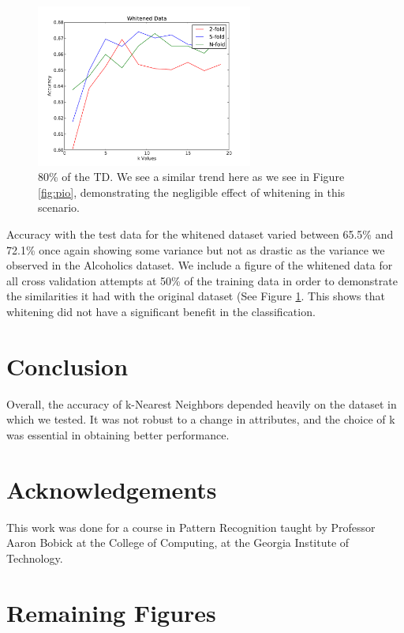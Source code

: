 \documentclass[conference]{acmsiggraph}
\begin{document}
\begin{figure}[ht]
  \centering
  \includegraphics[width=2.8in]{images/pi_w_50.pdf}
  \caption{80\% of the TD. We see a similar trend here as we see in Figure \ref{fig:pio}, demonstrating the negligible effect of whitening in this scenario. }
  \label{fig:piw}
\end{figure}

Accuracy with the test data for the whitened dataset varied between 65.5\% and 72.1\% once again showing some variance but not as drastic as the variance we observed in the Alcoholics dataset. We include a figure of the whitened data for all cross validation attempts at 50\% of the training data in order to demonstrate the similarities it had with the original dataset (See Figure \ref{fig:piw}. This shows that whitening did not have a significant benefit in the classification.



\section{Conclusion}

Overall, the accuracy of k-Nearest Neighbors depended heavily on the dataset in which we tested. It was not robust to a change in attributes, and the choice of k was essential in obtaining better performance.

\section*{Acknowledgements}

This work was done for a course in Pattern Recognition taught by Professor Aaron Bobick at the College of Computing, at the Georgia Institute of Technology.




\clearpage

\section{Remaining Figures}
\end{document}
